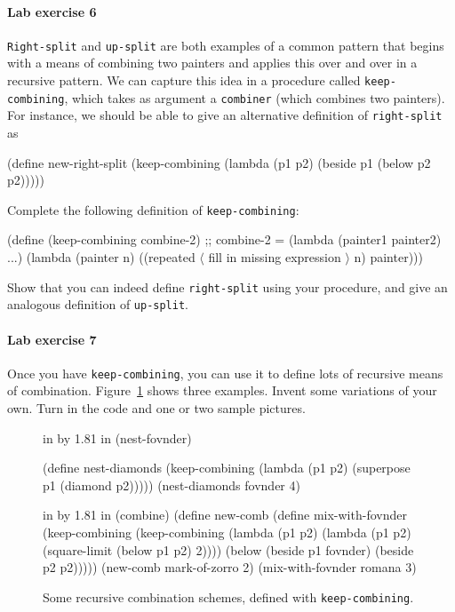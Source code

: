\paragraph{Lab exercise 6}
{\tt Right-split} and {\tt up-split} are both examples of a common
pattern that begins with a means of combining two painters and applies
this over and over in a recursive pattern.  We can capture this idea
in a procedure called {\tt keep-combining}, which takes as argument a
{\tt combiner} (which combines two painters).  For instance, we should
be able to give an alternative definition of {\tt right-split} as

\beginlisp
(define new-right-split
  (keep-combining
   (lambda (p1 p2)
     (beside p1 (below p2 p2)))))
\endlisp

\noindent
Complete the following definition of {\tt keep-combining}:

\beginlisp
(define (keep-combining combine-2)
  ;; combine-2 = (lambda (painter1 painter2) ...)
  (lambda (painter n)
    ((repeated
      {\rm $\langle$ fill in missing expression $\rangle$}
      n)
     painter)))
\endlisp

\noindent
Show that you can indeed define {\tt right-split} using your
procedure, and give an analogous definition of {\tt up-split}.


\paragraph{Lab exercise 7}
Once you have {\tt keep-combining}, you can use it to define lots of
recursive means of combination.  Figure~\ref{keep-combining} shows
three examples.  Invent some variations of your own.  Turn in the code
and one or two sample pictures.

\begin{figure}
 in by 1.81 in (nest-fovnder)

\beginlisp
                     (define nest-diamonds
                       (keep-combining
                        (lambda (p1 p2) (superpose p1 (diamond p2)))))
\null
                     (nest-diamonds fovnder 4)
\endlisp

 in by 1.81 in (combine)
\beginlisp
     (define new-comb                              (define mix-with-fovnder
       (keep-combining                               (keep-combining
        (lambda (p1 p2)                               (lambda (p1 p2)
          (square-limit (below p1 p2) 2))))             (below (beside p1
                                                                       fovnder)
                                                               (beside p2 p2)))))
\null                                                      
     (new-comb mark-of-zorro 2)                     (mix-with-fovnder romana 3)
\endlisp
\caption{{\protect\footnotesize
Some recursive combination schemes, defined with {\tt keep-combining}.}}
\label{keep-combining}
\end{figure} 

